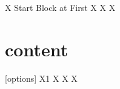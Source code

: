 \documentclass{article}
\begin{document}
X Start Block at First
X
X
X
\part*{content}[options]
    X1
    X
    X
    X
\end{document}
